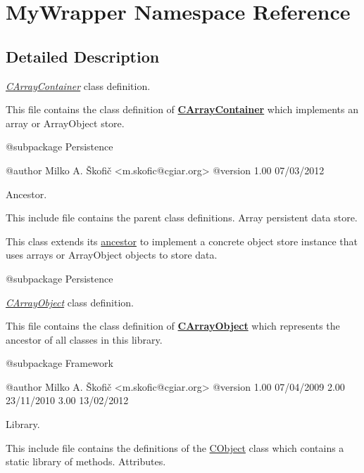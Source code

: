 \hypertarget{namespace_my_wrapper}{\section{My\-Wrapper Namespace Reference}
\label{namespace_my_wrapper}
}


\subsection{Detailed Description}
{\itshape \hyperlink{class_c_array_container}{C\-Array\-Container}} class definition.

This file contains the class definition of {\bfseries \hyperlink{class_c_array_container}{C\-Array\-Container}} which implements an array or Array\-Object store.

\begin{DoxyVerb} @subpackage        Persistence

 @author            Milko A. Škofič <m.skofic@cgiar.org>
 @version   1.00 07/03/2012\end{DoxyVerb}


Ancestor.

This include file contains the parent class definitions. Array persistent data store.

This class extends its \hyperlink{class_c_container}{ancestor} to implement a concrete object store instance that uses arrays or Array\-Object objects to store data.

\begin{DoxyVerb} @subpackage        Persistence\end{DoxyVerb}


{\itshape \hyperlink{class_c_array_object}{C\-Array\-Object}} class definition.

This file contains the class definition of {\bfseries \hyperlink{class_c_array_object}{C\-Array\-Object}} which represents the ancestor of all classes in this library.

\begin{DoxyVerb} @subpackage        Framework

 @author            Milko A. Škofič <m.skofic@cgiar.org>
 @version   1.00 07/04/2009
                    2.00 23/11/2010
                    3.00 13/02/2012\end{DoxyVerb}


Library.

This include file contains the definitions of the \hyperlink{class_c_object}{C\-Object} class which contains a static library of methods. Attributes.

